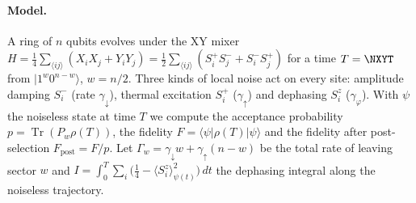 \documentclass[11pt]{article}
\DeclareMathOperator{\Tr}{Tr}
\begin{document}
\paragraph{Model.} A ring of $n$ qubits evolves under the XY mixer
$H=\tfrac14\sum_{\langle ij\rangle}(X_iX_j+Y_iY_j)=\tfrac12\sum_{\langle ij\rangle}(S^+_iS^-_j+S^-_iS^+_j)$
for a time $T=\NXYT$ from $|1^w0^{n-w}\rangle$, $w=n/2$. Three kinds of local noise act on every site: amplitude damping $S^-_i$
(rate $\gamma_\downarrow$), thermal excitation $S^+_i$ ($\gamma_\uparrow$) and dephasing $S^z_i$ ($\gamma_\varphi$).
With $\psi$ the noiseless state at time $T$ we compute the acceptance probability $p=\Tr(P_w\rho(T))$, the fidelity
$F=\langle\psi|\rho(T)|\psi\rangle$ and the fidelity after post-selection $F_{\mathrm{post}}=F/p$. Let
$\Gamma_w=\gamma_\downarrow w+\gamma_\uparrow(n-w)$ be the total rate of leaving sector $w$ and
$I=\int_0^T\sum_i\bigl(\frac14-\langle S^z_i\rangle_{\psi(t)}^2\bigr)\,dt$ the dephasing integral along the noiseless
trajectory.
\end{document}
